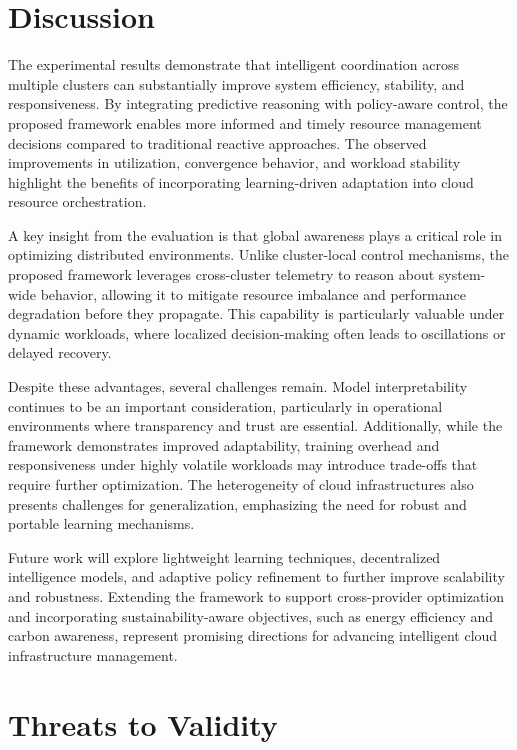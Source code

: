 \documentclass[conference]{IEEEtran}
\begin{document}
\section{Discussion}

The experimental results demonstrate that intelligent coordination across multiple clusters can substantially improve system efficiency, stability, and responsiveness. By integrating predictive reasoning with policy-aware control, the proposed framework enables more informed and timely resource management decisions compared to traditional reactive approaches. The observed improvements in utilization, convergence behavior, and workload stability highlight the benefits of incorporating learning-driven adaptation into cloud resource orchestration.

A key insight from the evaluation is that global awareness plays a critical role in optimizing distributed environments. Unlike cluster-local control mechanisms, the proposed framework leverages cross-cluster telemetry to reason about system-wide behavior, allowing it to mitigate resource imbalance and performance degradation before they propagate. This capability is particularly valuable under dynamic workloads, where localized decision-making often leads to oscillations or delayed recovery.

Despite these advantages, several challenges remain. Model interpretability continues to be an important consideration, particularly in operational environments where transparency and trust are essential. Additionally, while the framework demonstrates improved adaptability, training overhead and responsiveness under highly volatile workloads may introduce trade-offs that require further optimization. The heterogeneity of cloud infrastructures also presents challenges for generalization, emphasizing the need for robust and portable learning mechanisms.

Future work will explore lightweight learning techniques, decentralized intelligence models, and adaptive policy refinement to further improve scalability and robustness. Extending the framework to support cross-provider optimization and incorporating sustainability-aware objectives, such as energy efficiency and carbon awareness, represent promising directions for advancing intelligent cloud infrastructure management.

\section{Threats to Validity}
\end{document}
